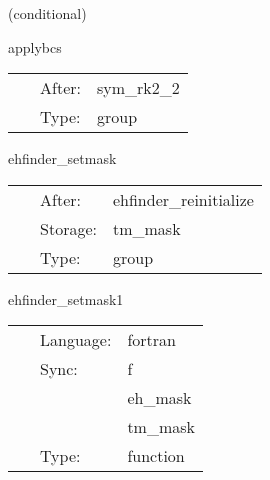 \vspace{5mm}

   (conditional) 

\hspace{5mm} applybcs 

\hspace{5mm}{\it apply boundary conditions (symmetries) } 


\hspace{5mm}

 \begin{tabular*}{160mm}{cll} 
~ & After:  & sym\_rk2\_2 \\ 
~ & Type:  & group \\ 
\end{tabular*} 


\vspace{5mm}


\hspace{5mm} ehfinder\_setmask 

\hspace{5mm}{\it set the mask } 


\hspace{5mm}

 \begin{tabular*}{160mm}{cll} 
~ & After:  & ehfinder\_reinitialize \\ 
~ & Storage:  & tm\_mask \\ 
~ & Type:  & group \\ 
\end{tabular*} 


\vspace{5mm}


\hspace{5mm} ehfinder\_setmask1 

\hspace{5mm}{\it start modifying the mask } 


\hspace{5mm}

 \begin{tabular*}{160mm}{cll} 
~ & Language:  & fortran \\ 
~ & Sync:  & f \\ 
~& ~ &eh\_mask\\ 
~& ~ &tm\_mask\\ 
~ & Type:  & function \\ 
\end{tabular*} 


